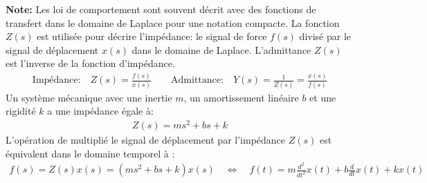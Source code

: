 \textbf{Note:} Les loi de comportement sont souvent décrit avec des fonctions de transfert dans le domaine de Laplace pour une notation compacte. La fonction $Z(s)$ est utilisée pour décrire l'impédance: le signal de force $f(s)$ divisé par le signal de déplacement $x(s)$ dans le domaine de Laplace. L'admittance $Z(s)$ est l'inverse de la fonction d'impédance. 
\begin{align}
\text{Impédance:} \quad Z(s) = \frac{f(s)}{x(s)} \quad\quad \text{Admittance:} \quad Y(s) =  \frac{1}{Z(s)} = \frac{x(s)}{f(s)}
\end{align}
Un système mécanique avec une inertie $m$, un amortissement linéaire $b$ et une rigidité $k$ a une impédance égale à:
\begin{align}
Z(s) = m s^2 + b s + k 
\end{align}
L'opération de multiplié le signal de déplacement par l'impédance $Z(s)$ est équivalent dans le domaine temporel à :
\begin{align}
f(s) = Z(s) x(s) = \left( m s^2 + b s + k \right) x(s) \quad \Longleftrightarrow \quad 
f(t) = m \frac{d^2}{dt^2} x(t) + b \frac{d}{dt} x(t) + k x(t) 
\end{align}


